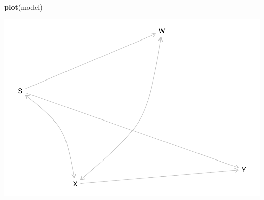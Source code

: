 \documentclass[12pt,]{book}
\newenvironment{Shaded}{\begin{snugshade}}{\end{snugshade}}
\newcommand{\KeywordTok}[1]{\textcolor[rgb]{0.13,0.29,0.53}{\textbf{#1}}}
\newcommand{\NormalTok}[1]{#1}
\begin{document}
\begin{Shaded}
\begin{Highlighting}[]
\KeywordTok{plot}\NormalTok{(model)}
\end{Highlighting}
\end{Shaded}

\includegraphics{ii_files/figure-latex/unnamed-chunk-115-1.pdf}
\end{document}
